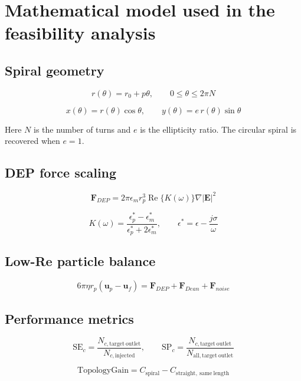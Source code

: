 \section*{Mathematical model used in the feasibility analysis}

\subsection*{Spiral geometry}
\[
r(\theta)=r_0+p\theta,\qquad 0\leq \theta \leq 2\pi N
\]

\[
x(\theta)=r(\theta)\cos\theta,\qquad
y(\theta)=e\,r(\theta)\sin\theta
\]

Here \(N\) is the number of turns and \(e\) is the ellipticity ratio. The circular spiral is recovered when \(e=1\).

\subsection*{DEP force scaling}
\[
\mathbf{F}_{DEP}=2\pi \epsilon_m r_p^3 \operatorname{Re}\{K(\omega)\}\nabla |\mathbf{E}|^2
\]

\[
K(\omega)=\frac{\epsilon_p^\ast-\epsilon_m^\ast}{\epsilon_p^\ast+2\epsilon_m^\ast},
\qquad
\epsilon^\ast=\epsilon-\frac{j\sigma}{\omega}
\]

\subsection*{Low-Re particle balance}
\[
6\pi\eta r_p(\mathbf{u}_p-\mathbf{u}_f)=\mathbf{F}_{DEP}+\mathbf{F}_{Dean}+\mathbf{F}_{noise}
\]

\subsection*{Performance metrics}
\[
\mathrm{SE}_c=\frac{N_{c,\mathrm{target\ outlet}}}{N_{c,\mathrm{injected}}},
\qquad
\mathrm{SP}_c=\frac{N_{c,\mathrm{target\ outlet}}}{N_{\mathrm{all,target\ outlet}}}
\]

\[
\mathrm{TopologyGain}=C_{\mathrm{spiral}}-C_{\mathrm{straight,\ same\ length}}
\]
